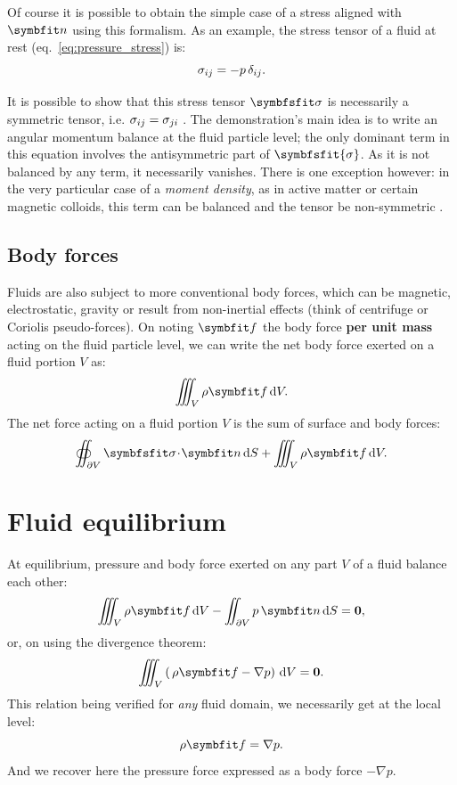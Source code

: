 \noindent Of course it is possible to obtain the simple case of a stress aligned with $\bn$ using this formalism. As an example, the stress tensor of a fluid at rest (eq.~\ref{eq:pressure_stress}) is:
\begin{equation}
\sigma_{ij} = -p\, \delta_{ij}.
\label{eq:static_stress_tensor}
\end{equation}

\noindent It is possible to show that this stress tensor $\symbfsfit \sigma$ is necessarily a symmetric tensor, i.e. $\sigma_{ij} = \sigma_{ji}$ \citep[][\S 1.3]{Batchelor1967}. The demonstration's main idea is to write an angular momentum balance at the fluid particle level; the only dominant term in this equation involves the antisymmetric part of $\symbfsfit{\sigma}$. As it is not balanced by any term, it necessarily vanishes. There is one exception however: in the very particular case of a \textit{moment density}, as in active matter or certain magnetic colloids, this term can be balanced and the tensor be non-symmetric \citep[see for example the study of][]{Soni2019}. 
\subsection{Body forces}
\noindent Fluids are also subject to more conventional body forces, which can be magnetic, electrostatic, gravity or result from non-inertial effects (think of centrifuge or Coriolis pseudo-forces). On noting $\bff$ the body force \textbf{per unit mass} acting on the fluid particle level, we can write the net body force exerted on a fluid portion $V$ as:
\begin{equation}
\iiint_V \rho \bff \,\dV.
\end{equation}
 The net force acting on a fluid portion $V$ is the sum of surface and body forces:
\begin{equation}
\oiint_{\partial V} \symbfsfit \sigma \!\cdot\! \bn\,\dS + \iiint_V \rho \bff \,\dV.
\end{equation}
\section{Fluid equilibrium}
\noindent At equilibrium, pressure and body force exerted on any part $V$ of a fluid balance each other:
$$
\iiint_V \rho \bff \,\dV -\iint_{\partial V} p \, \bn \, \dS = \boldsymbol 0,
$$
or, on using the divergence theorem:
\begin{equation}
\iiint_V \lp \,\rho \bff -\nabla p \rp\,\dV = \boldsymbol 0.
\end{equation}
This relation being verified for \textit{any} fluid domain, we necessarily get at the local level:
\begin{equation}
\rho \bff =\nabla p.
\end{equation}
And we recover here the pressure force expressed as a body force $-\nabla p$.

